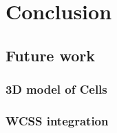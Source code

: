 \chapter{Conclusion}
\section{Future work}
\subsection{3D model of Cells}
\subsection{WCSS integration}